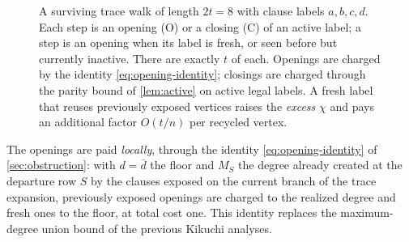 \documentclass[11pt]{article}
\theoremstyle{definition}
\theoremstyle{remark}
\newcommand{\1}{\mathbf 1}
\newcommand{\bd}{\bar d}
\numberwithin{equation}{section}
\begin{document}
\begin{figure}[t]
\centering
{}
\caption{A surviving trace walk of length $2t=8$ with clause labels
$a,b,c,d$.  Each step is an opening (O) or a closing (C) of an active
label; a step is an opening when its label is fresh, or seen before but
currently inactive.  There are exactly $t$ of each.  Openings are
charged by the identity
\cref{eq:opening-identity}; closings are charged through the parity
bound of \cref{lem:active} on active legal labels.  A fresh label that
reuses previously exposed vertices raises the \emph{excess} $\chi$ and
pays an additional factor $O(t/n)$ per recycled vertex.}
\label{fig:walk}
\end{figure}

The openings are paid \emph{locally}, through the
identity \cref{eq:opening-identity} of \cref{sec:obstruction}: with
$d=\bd$ the floor and $M_S$ the degree already created at the departure
row $S$ by the clauses exposed on the current branch of the trace
expansion, previously exposed openings are charged to the realized
degree and fresh ones to the floor, at total cost one.  This identity
replaces the maximum-degree union bound of the previous Kikuchi
analyses.
\end{document}
